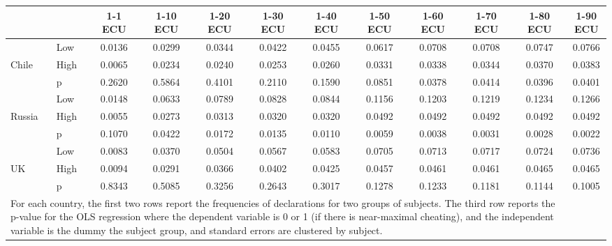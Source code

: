 \def\sym#1{\ifmmode^{#1}\else\(^{#1}\)\fi}
\begin{tabular}{|ll|cccccccccc|}
\hline\hline
&&1-1 ECU&1-10 ECU&1-20 ECU&1-30 ECU&1-40 ECU&1-50 ECU&1-60 ECU&1-70 ECU&1-80 ECU&1-90 ECU\\
\hline
&Low&   0.0136&   0.0299&   0.0344&   0.0422&   0.0455&   0.0617&   0.0708&   0.0708&   0.0747&   0.0766\\
Chile&High&   0.0065&   0.0234&   0.0240&   0.0253&   0.0260&   0.0331&   0.0338&   0.0344&   0.0370&   0.0383\\
&p&   0.2620&   0.5864&   0.4101&   0.2110&   0.1590&   0.0851&   0.0378&   0.0414&   0.0396&   0.0401\\
\hline&Low&   0.0148&   0.0633&   0.0789&   0.0828&   0.0844&   0.1156&   0.1203&   0.1219&   0.1234&   0.1266\\
Russia&High&   0.0055&   0.0273&   0.0313&   0.0320&   0.0320&   0.0492&   0.0492&   0.0492&   0.0492&   0.0492\\
&p&   0.1070&   0.0422&   0.0172&   0.0135&   0.0110&   0.0059&   0.0038&   0.0031&   0.0028&   0.0022\\
\hline&Low&   0.0083&   0.0370&   0.0504&   0.0567&   0.0583&   0.0705&   0.0713&   0.0717&   0.0724&   0.0736\\
UK&High&   0.0094&   0.0291&   0.0366&   0.0402&   0.0425&   0.0457&   0.0461&   0.0461&   0.0465&   0.0465\\
&p&   0.8343&   0.5085&   0.3256&   0.2643&   0.3017&   0.1278&   0.1233&   0.1181&   0.1144&   0.1005\\
\hline\multicolumn{11}{p{15cm}}{\tiny For each country, the first two rows report the frequencies of declarations for two groups of subjects. The third row reports the p-value for the OLS regression where the dependent variable is 0 or 1 (if there is near-maximal cheating), and the independent variable is the dummy the subject group, and standard errors are clustered by subject. }\\
\end{tabular}